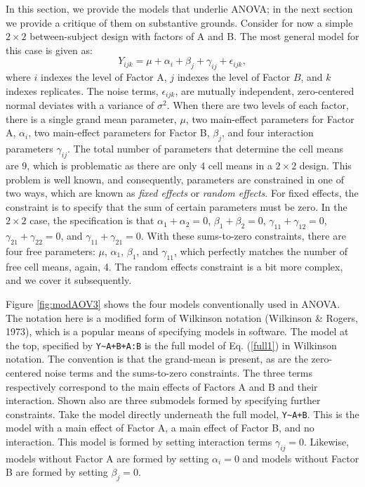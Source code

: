 \documentclass[
  english,
  ,man]{apa6}
\begin{document}
In this section, we provide the models that underlie ANOVA; in the next section we provide a critique of them on substantive grounds. Consider for now a simple \(2\times 2\) between-subject design with factors of A and B. The most general model for this case is given as:
\begin{equation} \label{full1}
Y_{ijk} = \mu+\alpha_i+\beta_j+\gamma_{ij} +\epsilon_{ijk},
\end{equation}
where \(i\) indexes the level of Factor A, \(j\) indexes the level of Factor \(B\), and \(k\) indexes replicates. The noise terms, \(\epsilon_{ijk}\), are mutually independent, zero-centered normal deviates with a variance of \(\sigma^2\). When there are two levels of each factor, there is a single grand mean parameter, \(\mu\), two main-effect parameters for Factor A, \(\alpha_i\), two main-effect parameters for Factor B, \(\beta_j\), and four interaction parameters \(\gamma_{ij}\). The total number of parameters that determine the cell means are 9, which is problematic as there are only 4 cell means in a \(2\times 2\) design. This problem is well known, and consequently, parameters are constrained in one of two ways, which are known as \emph{fixed effects} or \emph{random effects}. For fixed effects, the constraint is to specify that the sum of certain parameters must be zero. In the \(2\times 2\) case, the specification is that \(\alpha_1+\alpha_2=0\), \(\beta_1+\beta_2=0\), \(\gamma_{11}+\gamma_{12}=0\), \(\gamma_{21}+\gamma_{22}=0\), and \(\gamma_{11}+\gamma_{21}=0\). With these sums-to-zero constraints, there are four free parameters: \(\mu\), \(\alpha_1\), \(\beta_1\), and \(\gamma_{11}\), which perfectly matches the number of free cell means, again, 4. The random effects constraint is a bit more complex, and we cover it subsequently.

Figure \ref{fig:modAOV3} shows the four models conventionally used in ANOVA. The notation here is a modified form of Wilkinson notation (Wilkinson \& Rogers, 1973), which is a popular means of specifying models in software. The model at the top, specified by \texttt{Y\textasciitilde{}A+B+A:B} is the full model of Eq. (\ref{full1}) in Wilkinson notation. The convention is that the grand-mean is present, as are the zero-centered noise terms and the sums-to-zero constraints. The three terms respectively correspond to the main effects of Factors A and B and their interaction. Shown also are three submodels formed by specifying further constraints. Take the model directly underneath the full model, \texttt{Y\textasciitilde{}A+B}. This is the model with a main effect of Factor A, a main effect of Factor B, and no interaction. This model is formed by setting interaction terms \(\gamma_{ij}=0\). Likewise, models without Factor A are formed by setting \(\alpha_i=0\) and models without Factor B are formed by setting \(\beta_j=0\).
\end{document}
